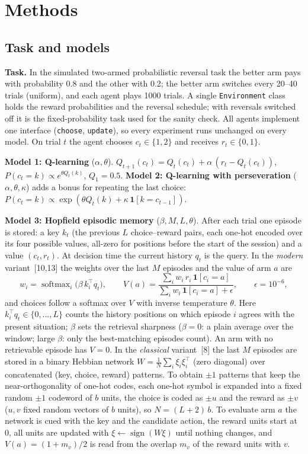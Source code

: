 \documentclass[10pt,a4paper]{article}
\begin{document}
\section{Methods}
\subsection{Task and models}
\textbf{Task.} In the simulated two-armed probabilistic reversal task the better arm pays with probability 0.8
and the other with 0.2; the better arm switches every 20--40 trials (uniform), and each agent plays 1000 trials.
A single \texttt{Environment} class holds the reward probabilities and the reversal schedule; with reversals
switched off it is the fixed-probability task used for the sanity check. All agents implement one interface
(\texttt{choose}, \texttt{update}), so every experiment runs unchanged on every model.
On trial $t$ the agent chooses $c_t\in\{1,2\}$ and receives $r_t\in\{0,1\}$.

\textbf{Model 1: Q-learning} ($\alpha,\theta$).
$Q_{t+1}(c_t)=Q_t(c_t)+\alpha\,(r_t-Q_t(c_t))$, $P(c_t=k)\propto e^{\theta Q_t(k)}$, $Q_1=0.5$.
\textbf{Model 2: Q-learning with perseveration} ($\alpha,\theta,\kappa$) adds a bonus for repeating the last
choice: $P(c_t=k)\propto \exp(\theta Q_t(k)+\kappa\,\mathbf 1[k=c_{t-1}])$.

\textbf{Model 3: Hopfield episodic memory} ($\beta,M,L,\theta$). After each trial one episode is stored: a key
$k_t$ (the previous $L$ choice--reward pairs, each one-hot encoded over its four possible values, all-zero for
positions before the start of the session) and a value $(c_t,r_t)$. At decision time the current history $q_t$ is
the query. In the \emph{modern} variant~[10,13] the weights over the last $M$ episodes and the value of arm $a$ are
\begin{equation}
w_i=\operatorname{softmax}_i\!\big(\beta\,k_i^{\top}q_t\big),\qquad
V(a)=\frac{\sum_i w_i\,r_i\,\mathbf 1[c_i=a]}{\sum_i w_i\,\mathbf 1[c_i=a]+\epsilon},\qquad \epsilon=10^{-6},
\label{eq:hop}
\end{equation}
and choices follow a softmax over $V$ with inverse temperature $\theta$. Here $k_i^{\top}q_t\in\{0,\dots,L\}$
counts the history positions on which episode $i$ agrees with the present situation; $\beta$ sets the retrieval
sharpness ($\beta=0$: a plain average over the window; large $\beta$: only the best-matching episodes count).
An arm with no retrievable episode has $V=0$.
In the \emph{classical} variant~[8] the last $M$ episodes are stored in a binary Hebbian network
$W=\frac1N\sum_i\xi_i\xi_i^{\top}$ (zero diagonal) over concatenated (key, choice, reward) patterns. To obtain
$\pm1$ patterns that keep the near-orthogonality of one-hot codes, each one-hot symbol is expanded into a fixed
random $\pm1$ codeword of $b$ units, the choice is coded as $\pm u$ and the reward as $\pm v$ ($u,v$ fixed random
vectors of $b$ units), so $N=(L+2)\,b$. To evaluate arm $a$ the network is cued with the key and the candidate
action, the reward units start at 0, all units are updated with $\xi\leftarrow\operatorname{sign}(W\xi)$ until
nothing changes, and $V(a)=(1+m_v)/2$ is read from the overlap $m_v$ of the reward units with $v$.
\end{document}
